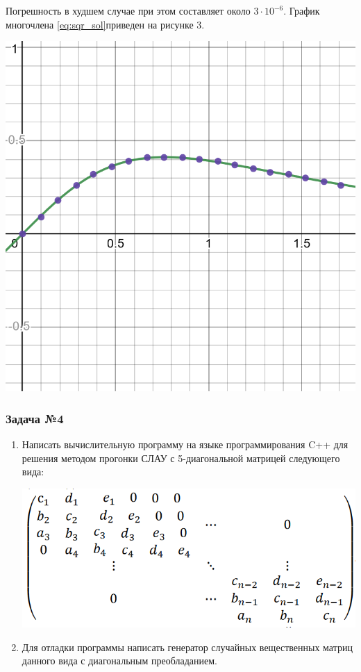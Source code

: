 \documentclass[a4paper, fontsize=14pt]{article}
\begin{document}
Погрешность в худшем случае при этом составляет около $3 \cdot 10^{-6}$. График многочлена \eqref{eq:sqr_sol}приведен на рисунке 3.
\begin{center}
    \label{p1q4}
        \includegraphics[scale=0.3]{src/least_sqr_des.png}
\end{center}

\subsubsection*{Задача №4}
\begin{enumerate}
    \item Написать вычислительную программу на языке программирования C++
    для решения методом прогонки СЛАУ с 5-диагональной матрицей
    следующего вида:
    \begin{center}
        \includegraphics[]{src/pentadiagonal.png}
    \end{center}
    \item Для отладки программы написать генератор случайных вещественных
матриц данного вида с диагональным преобладанием.
\end{enumerate}
\end{document}
